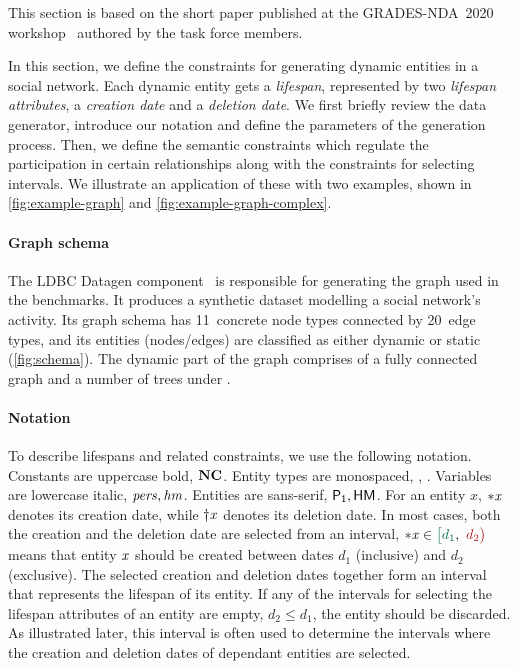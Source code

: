 This section is based on the short paper published at the GRADES-NDA~2020 workshop~\cite{DBLP:conf/sigmod/WaudbySPS20} authored by the task force members.


In this section, we define the constraints for generating dynamic entities in a social network. Each dynamic entity gets a \emph{lifespan}, represented by two \emph{lifespan attributes}, a \emph{creation date} and a \emph{deletion date}.
We first briefly review the data generator, introduce our notation and define the parameters of the generation process. Then, we define the semantic constraints which regulate the participation in certain relationships along with the constraints for selecting intervals. We illustrate an application of these with two examples, shown in \autoref{fig:example-graph} and \autoref{fig:example-graph-complex}.

\paragraph{Graph schema}

The LDBC Datagen component~\cite{Pham2012,Datagen} is responsible for generating the graph used in the benchmarks. It produces a synthetic dataset modelling a social network's activity. Its graph schema has 11~concrete node types connected by 20~edge types, and its entities (nodes/edges) are classified as either dynamic or static (\autoref{fig:schema}).
The dynamic part of the graph comprises of a fully connected \tPerson graph and a number of \tMessage trees under \tForums.

\paragraph{Notation}
To describe lifespans and related constraints, we use the following notation.
Constants are uppercase bold, \eg $\textbf{NC}$.
Entity types are monospaced, \eg \tPerson, \tHasMember.
Variables are lowercase italic, \eg $\mathit{pers}, \mathit{hm}$.
Entities are sans-serif, \eg $\mathsf{P_1}, \mathsf{HM}$.
For an entity $x$, ${\ast}\mathit{x}{}$ denotes its creation date, while ${\dagger}\mathit{x}{}$ denotes its deletion date.
In most cases, both the creation and the deletion date are selected from an interval, \eg $\varc{x}{} \in \interval{d_1}{d_2}$ means that entity $\mathit{x}$ should be created between dates $d_1$ (inclusive) and $d_2$ (exclusive).
The selected creation and deletion dates together form an interval that represents the lifespan of its entity.
If any of the intervals for selecting the lifespan attributes of an entity are empty, \ie $d_2 \leq d_1$, the entity should be discarded.
As illustrated later, this interval is often used to determine the intervals where the creation and deletion dates of dependant entities are selected.


